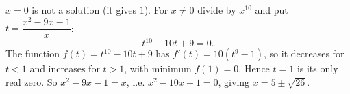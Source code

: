 $x=0$ is not a solution (it gives $1$). For $x\ne0$ divide by $x^{10}$ and put $t=\dfrac{x^2-9x-1}{x}$:
\[
t^{10}-10t+9=0 .
\]
The function $f(t)=t^{10}-10t+9$ has $f'(t)=10(t^9-1)$, so it decreases for $t<1$ and increases for $t>1$, with minimum $f(1)=0$. Hence $t=1$ is its only real zero. So $x^2-9x-1=x$, i.e. $x^2-10x-1=0$, giving $\boxed{x=5\pm\sqrt{26}}$.
